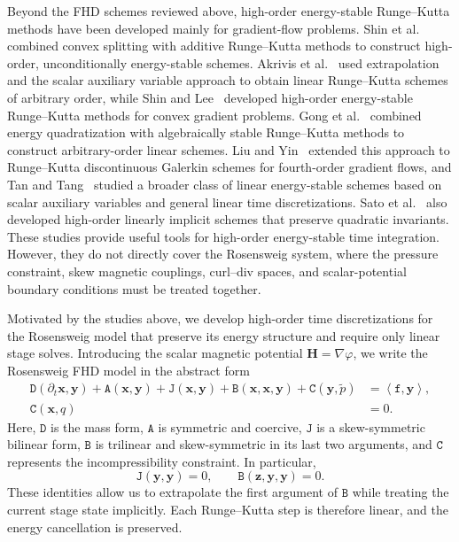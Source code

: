 \documentclass[11pt,a4paper]{article}
\newcommand{\bs}{\boldsymbol}
\newcommand{\DD}{\mathtt D}
\newcommand{\Aform}{\mathtt A}
\newcommand{\JJ}{\mathtt J}
\newcommand{\BB}{\mathtt B}
\newcommand{\CC}{\mathtt C}
\newcommand{\ff}{\mathtt f}
\newcommand{\dual}[2]{\left\langle#1,#2\right\rangle}
\theoremstyle{definition}
\numberwithin{equation}{section}
\begin{document}
Beyond the FHD schemes reviewed above, high-order energy-stable
Runge--Kutta methods have been developed mainly for gradient-flow
problems. Shin et al.~\cite{ShinLeeLee2017} combined convex splitting
with additive Runge--Kutta methods to construct high-order,
unconditionally energy-stable schemes. Akrivis et
al.~\cite{HO_AkrivisLiLi2019} used extrapolation and the scalar
auxiliary variable approach to obtain linear Runge--Kutta schemes of
arbitrary order, while Shin and Lee~\cite{ShinLee2020} developed
high-order energy-stable Runge--Kutta methods for convex gradient
problems. Gong et al.~\cite{HO_GongZhaoWang2020} combined energy
quadratization with algebraically stable Runge--Kutta methods to
construct arbitrary-order linear schemes. Liu and
Yin~\cite{LiuYin2022} extended this approach to Runge--Kutta
discontinuous Galerkin schemes for fourth-order gradient flows, and
Tan and Tang~\cite{TanTang2022} studied a broader class of linear
energy-stable schemes based on scalar auxiliary variables and general
linear time discretizations. Sato et
al.~\cite{HO_SatoMiyatakeButcher2023} also developed high-order
linearly implicit schemes that preserve quadratic invariants. These
studies provide useful tools for high-order energy-stable time
integration. However, they do not directly cover the Rosensweig
system, where the pressure constraint, skew magnetic couplings,
curl--div spaces, and scalar-potential boundary conditions must be
treated together.


Motivated by the studies above, we develop high-order time
discretizations for the Rosensweig model that preserve its energy
structure and require only linear stage solves. Introducing the scalar
magnetic potential
\(
 \bs H=\nabla\varphi
\),
we write the Rosensweig FHD model in the abstract form
\begin{equation}\label{eq:intro-abstract}
\begin{aligned}
 \DD(\partial_t\bs x,\bs y)
 +\Aform(\bs x,\bs y)
 +\JJ(\bs x,\bs y)
 +\BB(\bs x,\bs x,\bs y)
 +\CC(\bs y,\widetilde p)
 &=
 \dual{\ff}{\bs y},
 \\
 \CC(\bs x,q)&=0.
\end{aligned}
\end{equation}
Here, \(\DD\) is the mass form, \(\Aform\) is symmetric and coercive,
\(\JJ\) is a skew-symmetric bilinear form, \(\BB\) is trilinear and
skew-symmetric in its last two arguments, and \(\CC\) represents the
incompressibility constraint. In particular,
\[
 \JJ(\bs y,\bs y)=0,
 \qquad
 \BB(\bs z,\bs y,\bs y)=0.
\]
These identities allow us to extrapolate the first argument of
\(\BB\) while treating the current stage state implicitly. Each
Runge--Kutta step is therefore linear, and the energy cancellation is
preserved.
\end{document}
